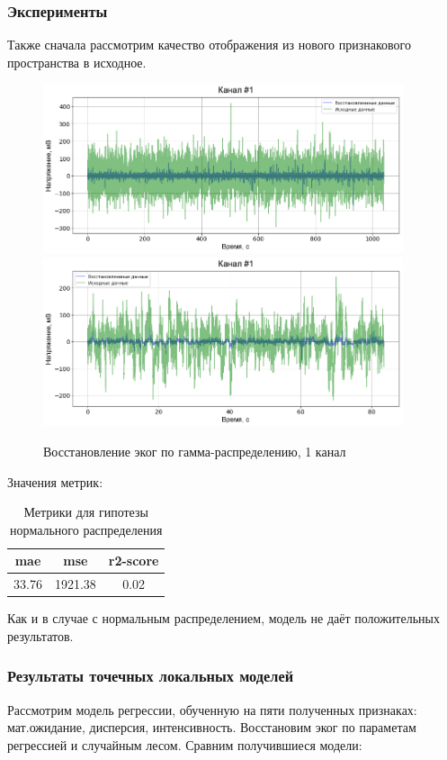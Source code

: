 \documentclass{mipt-thesis-bs}
\begin{document}
\subsubsection{Эксперименты}
Также сначала рассмотрим качество отображения из нового признакового пространства в исходное. 
\begin{figure}
\begin{center}
	\includegraphics[width=300pt,height=\textheight,keepaspectratio]{imgs/wishart_raw1.png}
	\includegraphics[width=300pt,height=\textheight,keepaspectratio]{imgs/wishart_raw1_80s.png}
	\caption{Восстановление эког по гамма-распределению, 1 канал}	
	\label{fig:gamma ecog}
	\end{center}
\end{figure}


Значения метрик:
\begin{table}[h]
  
  \centering
    \begin{tabular}{ | c | c | c | }
	\hline
	mae & mse & r2-score \\ \hline
	33.76 & 1921.38 & 0.02 \\

	\hline
	\end{tabular}
\caption{Метрики для гипотезы нормального распределения}
\label{table:gauss mae}
\end{table}


Как и в случае с нормальным распределением, модель не даёт положительных результатов.

 
\subsubsection{Результаты точечных локальных моделей}
Рассмотрим модель регрессии, обученную на пяти полученных признаках: мат.ожидание, дисперсия, интенсивность. Восстановим эког по параметам регрессией и случайным лесом. Сравним получившиеся модели:
\end{document}
